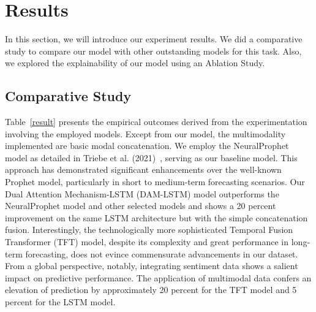 \section{Results}
\label{Results}
In this section, we will introduce our experiment results. We did a comparative study to compare our model with other outstanding models for this task. Also, we explored the explainability of our model using an Ablation Study.
\subsection{Comparative Study}
Table~\ref{result} presents the empirical outcomes derived from the experimentation involving the employed models. Except from our model, the multimodality implemented are basic modal concatenation. We employ the NeuralProphet model as detailed in Triebe et al. (2021)~\cite{triebe2021neuralprophet}, serving as our baseline model. This approach has demonstrated significant enhancements over the well-known Prophet model, particularly in short to medium-term forecasting scenarios. Our Dual Attention Mechanism-LSTM (DAM-LSTM) model outperforms the NeuralProphet model and other selected models and shows a 20 percent improvement on the same LSTM architecture but with the simple concatenation fusion. Interestingly, the technologically more sophisticated Temporal Fusion Transformer (TFT) model, despite its complexity and great performance in long-term forecasting, does not evince commensurate advancements in our dataset. From a global perspective, notably, integrating sentiment data shows a salient impact on predictive performance. The application of multimodal data confers an elevation of prediction by approximately 20 percent for the TFT model and 5 percent for the LSTM model.

